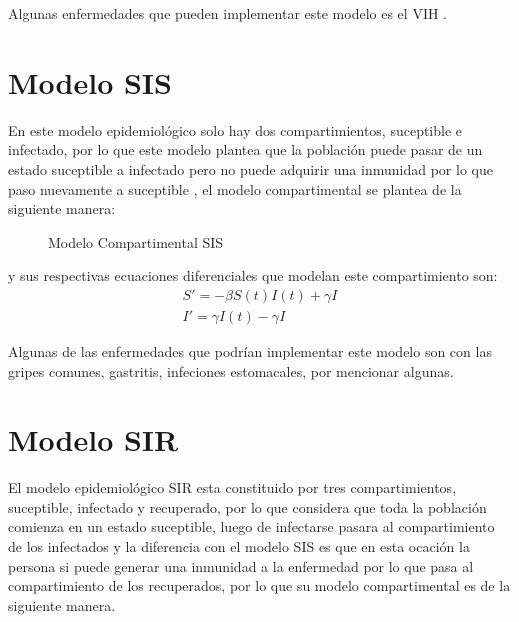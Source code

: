 Algunas enfermedades que pueden implementar este modelo es el VIH \cite{enfInf}.

\section{Modelo SIS}

En este modelo epidemiológico  solo hay dos compartimientos, suceptible e infectado, por lo que este modelo plantea que la población puede pasar de un estado suceptible a infectado pero no puede adquirir una inmunidad por lo que paso nuevamente a suceptible , el modelo compartimental se plantea de la siguiente manera:\\

\begin{figure}[h]
\centering
{}
\caption{Modelo Compartimental SIS} \label{fig:Compartimento SIS}
\end{figure}	

y sus respectivas ecuaciones diferenciales que modelan este compartimiento son: 
\begin{align} 
S' =  -\beta S\left(t\right)I\left(t\right) + \gamma I \\
I'   = \gamma I\left(t\right) - \gamma I
\end{align}

Algunas de las enfermedades que podrían implementar este modelo son con las gripes comunes, gastritis, infeciones estomacales, por mencionar algunas. \cite{Martcheva}

\section{Modelo SIR}

El modelo epidemiológico SIR  esta constituido por tres compartimientos, suceptible, infectado y recuperado, por lo que considera que toda la población comienza en un estado suceptible, luego de infectarse pasara al compartimiento de los infectados y la diferencia con el modelo SIS es que en esta ocación la persona si puede generar una inmunidad a la enfermedad por lo que pasa al compartimiento de los recuperados, por lo que su modelo compartimental es de la siguiente manera.\\

